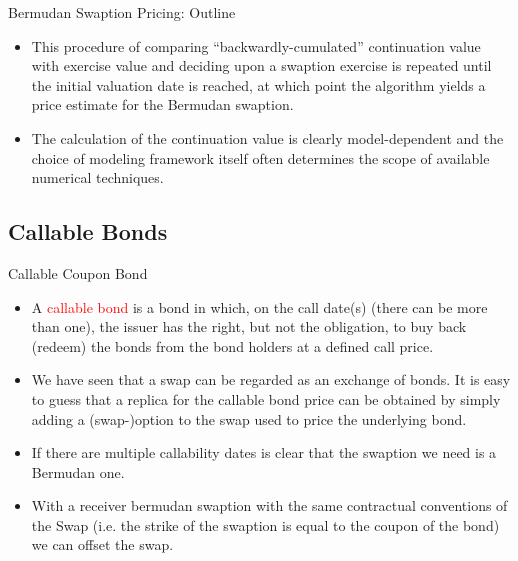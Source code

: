 \documentclass{beamer}
\begin{document}
\begin{frame}{Bermudan Swaption Pricing: Outline}
	\begin{itemize}
		\item<1-> This procedure of comparing “backwardly-cumulated” continuation value with exercise value and deciding upon a swaption exercise is repeated until the initial valuation date is reached, at which point the algorithm yields a price estimate for the Bermudan swaption. 
		\item<2-> The calculation of the continuation value is clearly model-dependent and the choice of modeling framework itself often determines the scope of available numerical techniques.
\end{itemize}
\end{frame}


\subsection{Callable Bonds}
\begin{frame}{Callable Coupon Bond}
\begin{itemize}
	\item<1-> A \textcolor{red}{callable bond} is a bond in which, on the call date(s) (there can be more than one), the issuer has the right, but not the obligation, to buy back (redeem) the bonds from the bond holders at a defined call price.
	\item<2-> We have seen that a swap can be regarded as an exchange of bonds. It is easy to guess that a replica for the callable bond price can be obtained by simply adding a (swap-)option to the swap used to price the underlying bond.
	\item<3-> If there are multiple callability dates is clear that the swaption we need is a Bermudan one.
	\item<4-> With a receiver bermudan swaption with the same contractual conventions of the Swap (i.e. the strike of the swaption is equal to the coupon of the bond) we can offset the swap. %
\end{itemize}
\end{frame}
\end{document}

